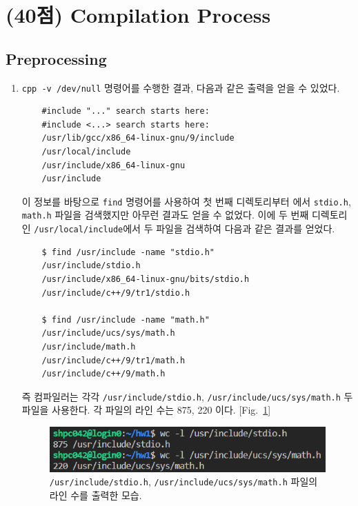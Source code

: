 \section{(40점) Compilation Process}

\subsection{Preprocessing}

\begin{enumerate}[label= (\alph*)]
    \item {
        \texttt{cpp -v /dev/null} 명령어를 수행한 결과, 다음과 같은 출력을 얻을 수 있었다.

        \begin{verbatim}
    #include "..." search starts here:
    #include <...> search starts here:
    /usr/lib/gcc/x86_64-linux-gnu/9/include
    /usr/local/include
    /usr/include/x86_64-linux-gnu
    /usr/include
        \end{verbatim}

        이 정보를 바탕으로 \texttt{find} 명령어를 사용하여 첫 번째 디렉토리부터 에서
        \texttt{stdio.h}, \texttt{math.h} 파일을 검색했지만 아무런 결과도 얻을 수 없었다.
        이에 두 번째 디렉토리인 \texttt{/usr/local/include}에서 두 파일을 검색하여
        다음과 같은 결과를 얻었다.

        \begin{verbatim}
    $ find /usr/include -name "stdio.h"
    /usr/include/stdio.h
    /usr/include/x86_64-linux-gnu/bits/stdio.h
    /usr/include/c++/9/tr1/stdio.h

    $ find /usr/include -name "math.h"
    /usr/include/ucs/sys/math.h
    /usr/include/math.h
    /usr/include/c++/9/tr1/math.h
    /usr/include/c++/9/math.h
        \end{verbatim}

        즉 컴파일러는 각각 \texttt{/usr/include/stdio.h}, \texttt{/usr/include/ucs/sys/math.h}
        두 파일을 사용한다. 각 파일의 라인 수는 875, 220 이다. [Fig.~\ref{fig:1-1_linenum}]

        \begin{figure}
            \centering
            \includegraphics[scale=1]{imgs/Figure01_wc.png}
            \caption{\label{fig:1-1_linenum}
                \texttt{/usr/include/stdio.h}, \texttt{/usr/include/ucs/sys/math.h}
                파일의 라인 수를 출력한 모습.
            }
        \end{figure}
    }


\end{enumerate}

